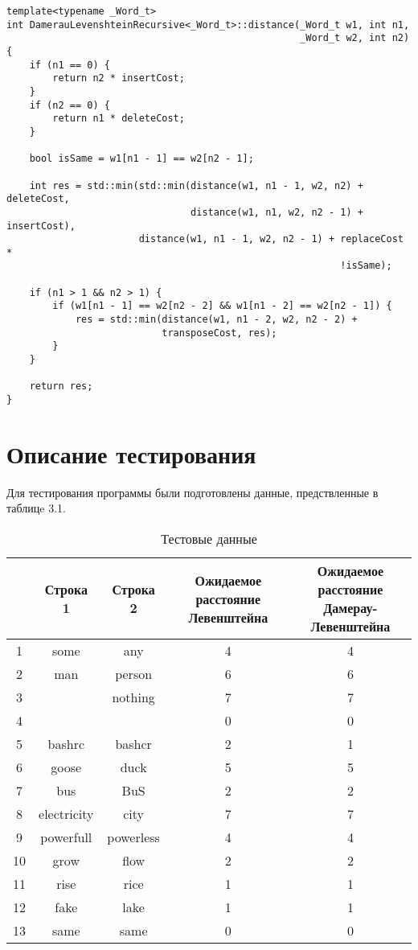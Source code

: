 \noindent\begin{minipage}{\textwidth}
\begin{lstlisting}[caption=Расстояние Дамерау-Левенштейна (рекурсивная реализация)]
template<typename _Word_t>
int DamerauLevenshteinRecursive<_Word_t>::distance(_Word_t w1, int n1,
                                                   _Word_t w2, int n2) {
    if (n1 == 0) {
        return n2 * insertCost;
    }
    if (n2 == 0) {
        return n1 * deleteCost;
    }

    bool isSame = w1[n1 - 1] == w2[n2 - 1];

    int res = std::min(std::min(distance(w1, n1 - 1, w2, n2) + deleteCost,
                                distance(w1, n1, w2, n2 - 1) + insertCost),
                       distance(w1, n1 - 1, w2, n2 - 1) + replaceCost *
                                                          !isSame);

    if (n1 > 1 && n2 > 1) {
        if (w1[n1 - 1] == w2[n2 - 2] && w1[n1 - 2] == w2[n2 - 1]) {
            res = std::min(distance(w1, n1 - 2, w2, n2 - 2) +
                           transposeCost, res);
        }
    }

    return res;
}
\end{lstlisting}
\end{minipage}

\section{Описание тестирования}
Для тестирования программы были подготовлены данные, предствленные в таблицe 3.1.

\begin{table}[H]
    \caption{Тестовые данные}
	\begin{tabular}{|c|c|c|c|c|}
 	\hline
    \No{} & Строка 1 & Строка 2 & \makecell{Ожидаемое расстояние\\Левенштейна} & \makecell{Ожидаемое расстояние\\Дамерау-Левенштейна} \\
 	\hline
 	1 & some & any & 4 & 4\\
 	\hline
 	2 & man & person & 6 & 6\\
 	\hline
 	3 & & nothing & 7 & 7\\
 	\hline
 	4 & & & 0 & 0\\
 	\hline
 	5 & bashrc & bashcr & 2 & 1\\
 	\hline
 	6 & goose & duck & 5 & 5\\
 	\hline
 	7 & bus & BuS & 2 & 2\\
 	\hline
 	8 & electricity & city & 7 & 7\\
 	\hline
 	9 & powerfull & powerless & 4 & 4\\
 	\hline
 	10 & grow & flow & 2 & 2\\
 	\hline
 	11 & rise & rice & 1 & 1\\
 	\hline
 	12 & fake & lake & 1 & 1\\
 	\hline
    13 & same & same & 0 & 0\\
    \hline
	\end{tabular}
\end{table}

